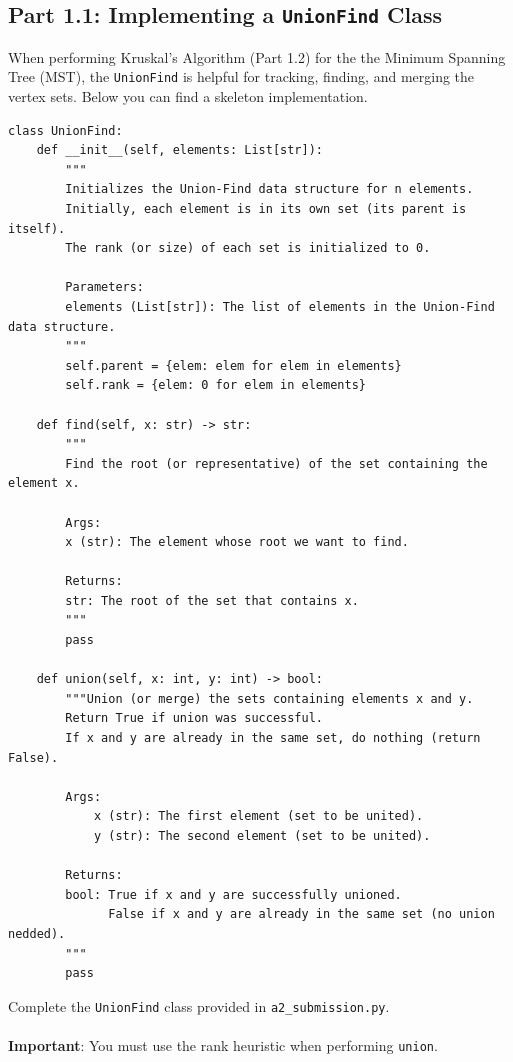 \documentclass[12pt]{report}
\begin{document}
\setcounter{chapter}{1}
\MakeScribeTop

\setlength\parindent{0pt}

\subsection*{Part 1.1: Implementing a \texttt{UnionFind} Class}
When performing Kruskal's Algorithm (Part 1.2) for the the Minimum Spanning Tree (MST), the \texttt{UnionFind} is helpful for tracking, finding, and merging the vertex sets. Below you can find a skeleton implementation.
    \begin{lstlisting}[style=mypython]
class UnionFind:
    def __init__(self, elements: List[str]):
        """
        Initializes the Union-Find data structure for n elements.
        Initially, each element is in its own set (its parent is itself).
        The rank (or size) of each set is initialized to 0.

        Parameters:
        elements (List[str]): The list of elements in the Union-Find data structure.
        """
        self.parent = {elem: elem for elem in elements}  
        self.rank = {elem: 0 for elem in elements}       
    
    def find(self, x: str) -> str:
        """
        Find the root (or representative) of the set containing the element x.
        
        Args:
        x (str): The element whose root we want to find.

        Returns:
        str: The root of the set that contains x.
        """
        pass
    
    def union(self, x: int, y: int) -> bool:
        """Union (or merge) the sets containing elements x and y. 
        Return True if union was successful.
        If x and y are already in the same set, do nothing (return False).

        Args:
            x (str): The first element (set to be united).
            y (str): The second element (set to be united).
        
        Returns:
        bool: True if x and y are successfully unioned.
              False if x and y are already in the same set (no union nedded).
        """
        pass
\end{lstlisting}
Complete the \texttt{UnionFind} class provided in \texttt{a2\_submission.py}.
\\~\\
\textbf{Important}: You must use the rank heuristic when performing \texttt{union}.
\clearpage
\end{document}
